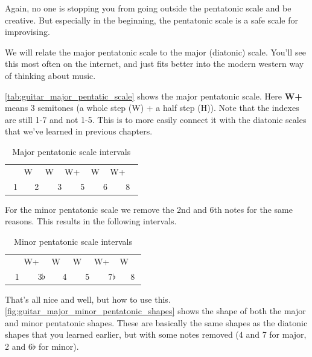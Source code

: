 Again, no one is stopping you from going outside the pentatonic scale and be creative. But especially in the beginning, the pentatonic scale is a safe scale for improvising.

\newpage

We will relate the major pentatonic scale to the major (diatonic) scale. You'll see this most often on the internet, and just fits better into the modern western way of thinking about music.

\autoref{tab:guitar_major_pentatic_scale} shows the major pentatonic scale. Here \textbf{W+} means 3 semitones (a whole step (W) + a half step (H)). Note that the indexes are still 1-7 and not 1-5. This is to more easily connect it with the diatonic scales that we've learned in previous chapters.

\begin{table}[h]
	\centering
	\begin{tabular}{*{12}{c}}
		& \multicolumn{2}{P{4mm}}{\large{W}} & \multicolumn{2}{P{4mm}}{\large{W}} & \multicolumn{2}{P{4mm}}{\large{W+}} & \multicolumn{2}{P{4mm}}{\large{W}} & \multicolumn{2}{P{4mm}}{\large{W+}} & \\
		\multicolumn{2}{P{4mm}}{1} & \multicolumn{2}{P{4mm}}{2} & \multicolumn{2}{P{4mm}}{3} & \multicolumn{2}{P{4mm}}{5} & \multicolumn{2}{P{4mm}}{6} & \multicolumn{2}{P{4mm}}{8}
	\end{tabular}
	\caption{Major pentatonic scale intervals}
	\label{tab:guitar_major_pentatic_scale}
\end{table}

For the minor pentatonic scale we remove the 2nd and 6th notes for the same reasons. This results in the following intervals.

\begin{table}[h]
	\centering
	\begin{tabular}{*{12}{c}}
		& \multicolumn{2}{P{4mm}}{\large{W+}} & \multicolumn{2}{P{4mm}}{\large{W}} & \multicolumn{2}{P{4mm}}{\large{W}} & \multicolumn{2}{P{4mm}}{\large{W+}} & \multicolumn{2}{P{4mm}}{\large{W}} & \\
		\multicolumn{2}{P{4mm}}{1} & \multicolumn{2}{P{4mm}}{3$\flat$} & \multicolumn{2}{P{4mm}}{4} & \multicolumn{2}{P{4mm}}{5} & \multicolumn{2}{P{4mm}}{7$\flat$} & \multicolumn{2}{P{4mm}}{8}
	\end{tabular}
	\caption{Minor pentatonic scale intervals}
	\label{tab:guitar_minor_pentatic_scale}
\end{table}


That's all nice and well, but how to use this. \autoref{fig:guitar_major_minor_pentatonic_shapes} shows the shape of both the major and minor pentatonic shapes. These are basically the same shapes as the diatonic shapes that you learned earlier, but with some notes removed (4 and 7 for major, 2 and 6$\flat$ for minor).

